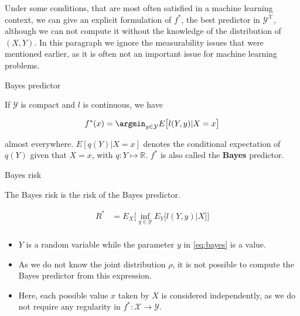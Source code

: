 \documentclass[
10pt, %
a4paper, %
oneside, %
headinclude,footinclude, %
BCOR5mm, %
]{scrartcl}
\begin{document}
    Under some conditions, that are most often satisfied in a machine learning
    context, we can give an explicit formulation of $f^*$, the best predictor
    in $ \mathcal{Y}^{ \mathcal{X} }$, although we can not compute it without
    the knowledge of the distribution of $(X,Y)$. In this paragraph we ignore
    the measurability issues that were mentioned earlier, as it is often not an
    important issue for machine learning problems.

    \begin{theorem}{Bayes predictor}
        
	If $ \mathcal{Y} $ is compact and $l$ is continuous, we have

	\begin{equation}
	    \label{eq:bayes}
	    f^*(x) = \argmin_{y\in \mathcal{Y} }E\big[ l(Y, y)|X=x\big]
	\end{equation}

	almost everywhere. $E[q(Y)|X=x]$ denotes the conditional expectation of $q(Y)$ given that $X=x$, with $ q:Y\mapsto \mathbb{R} $. $f^*$ is also called the \textbf{{Bayes}} predictor.
    \end{theorem}

    \begin{definition}{Bayes risk}

	The Bayes risk is the risk of the Bayes predictor.

	\begin{equation}
        \begin{aligned}
            \label{eq:}
	    R^* &= E_X\Big[ \inf_{y\in \mathcal{Y} }E_Y\big[ l(Y, y)|X\big] \Big]\\
        \end{aligned}
	\end{equation}
    \end{definition}


    \begin{remark}
	\begin{itemize}
	    \item $Y$ is a random variable while the parameter $y$ in \ref{eq:bayes} is a value.
	    \item As we do not know the joint distribution $\rho$, it is not possible to compute the Bayes predictor from this expression.
	    \item Here, each possible value $x$  taken by $X$ is considered independently, as we do not require any regularity in $f^*: \mathcal{X}\rightarrow \mathcal{Y} $.
	\end{itemize}
    \end{remark}
\end{document}
